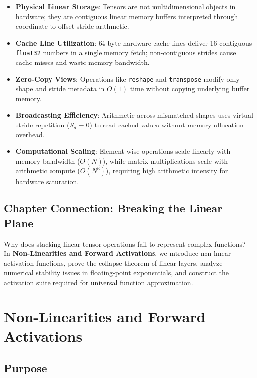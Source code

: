 \documentclass[
  letterpaper,
]{scrbook}
\providecommand{\tightlist}{%
  \setlength{\itemsep}{0pt}\setlength{\parskip}{0pt}}
\begin{document}
\begin{itemize}
\tightlist
\item
  \textbf{Physical Linear Storage}: Tensors are not multidimensional
  objects in hardware; they are contiguous linear memory buffers
  interpreted through coordinate-to-offset stride arithmetic.
\item
  \textbf{Cache Line Utilization}: 64-byte hardware cache lines deliver
  16 contiguous \texttt{float32} numbers in a single memory fetch;
  non-contiguous strides cause cache misses and waste memory bandwidth.
\item
  \textbf{Zero-Copy Views}: Operations like \texttt{reshape} and
  \texttt{transpose} modify only shape and stride metadata in \(O(1)\)
  time without copying underlying buffer memory.
\item
  \textbf{Broadcasting Efficiency}: Arithmetic across mismatched shapes
  uses virtual stride repetition (\(S_d = 0\)) to read cached values
  without memory allocation overhead.
\item
  \textbf{Computational Scaling}: Element-wise operations scale linearly
  with memory bandwidth (\(O(N)\)), while matrix multiplications scale
  with arithmetic compute (\(O(N^3)\)), requiring high arithmetic
  intensity for hardware saturation.
\end{itemize}

\section{Chapter Connection: Breaking the Linear
Plane}\label{chapter-connection-breaking-the-linear-plane}

Why does stacking linear tensor operations fail to represent complex
functions? In \textbf{Non-Linearities and Forward Activations}, we
introduce non-linear activation functions, prove the collapse theorem of
linear layers, analyze numerical stability issues in floating-point
exponentials, and construct the activation suite required for universal
function approximation.

\chapter{Non-Linearities and Forward
Activations}\label{non-linearities-and-forward-activations}

\section*{Purpose}\label{purpose-2}
\end{document}
